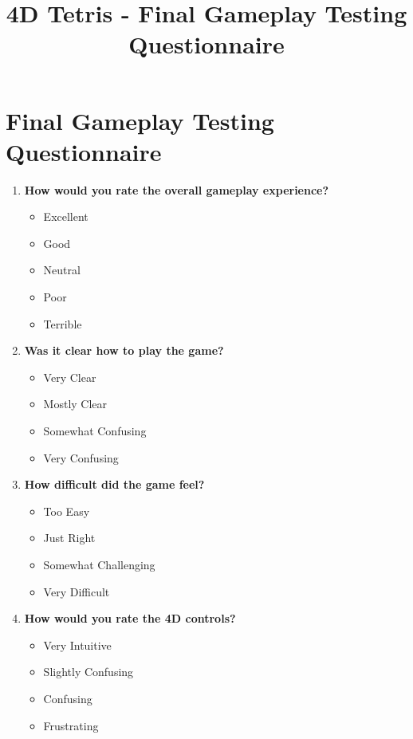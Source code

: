 \documentclass{article}
\title{4D Tetris - Final Gameplay Testing Questionnaire}
\date{}
\begin{document}
\section*{Final Gameplay Testing Questionnaire}
\renewcommand{\labelitemi}{\textsc{\ding{111}}}

\begin{multicols}{2}
\begin{enumerate}

    \item \textbf{How would you rate the overall gameplay experience?}
    \begin{itemize}
        \item Excellent
        \item Good
        \item Neutral
        \item Poor
        \item Terrible
    \end{itemize}

    \item \textbf{Was it clear how to play the game?}
    \begin{itemize}
        \item Very Clear
        \item Mostly Clear
        \item Somewhat Confusing
        \item Very Confusing
    \end{itemize}

    \item \textbf{How difficult did the game feel?}
    \begin{itemize}
        \item Too Easy
        \item Just Right
        \item Somewhat Challenging
        \item Very Difficult
    \end{itemize}

    \item \textbf{How would you rate the 4D controls?}
    \begin{itemize}
        \item Very Intuitive
        \item Slightly Confusing
        \item Confusing
        \item Frustrating
    \end{itemize}


\end{enumerate}
\end{multicols}
\end{document}

